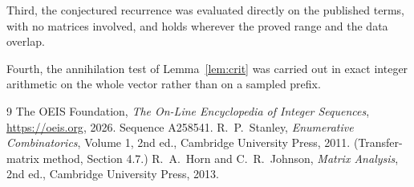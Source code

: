 \documentclass[11pt,a4paper]{article}
\theoremstyle{plain}
\theoremstyle{definition}
\begin{document}
Third, the conjectured recurrence was evaluated directly on the published terms, with no
matrices involved, and holds wherever the proved range and the data overlap.

Fourth, the annihilation test of Lemma~\ref{lem:crit} was carried out in exact integer
arithmetic on the whole vector rather than on a sampled prefix.

\begin{thebibliography}{9}
 The OEIS Foundation, \emph{The On-Line Encyclopedia of Integer
Sequences}, \url{https://oeis.org}, 2026. Sequence A258541.
 R.~P.~Stanley, \emph{Enumerative Combinatorics}, Volume 1, 2nd ed.,
Cambridge University Press, 2011. (Transfer-matrix method, Section 4.7.)
 R.~A.~Horn and C.~R.~Johnson, \emph{Matrix Analysis}, 2nd ed., Cambridge
University Press, 2013.
\end{thebibliography}
\end{document}
